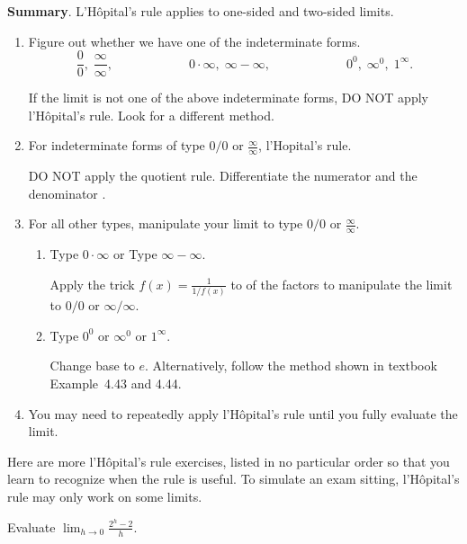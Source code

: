 \documentclass[../main.tex]{subfiles}
\begin{document}
\textbf{Summary}. L'H\^opital's rule applies to one-sided and two-sided limits. 

\begin{enumerate}[wide, label=(Step~\arabic*)., itemsep={2ex}]
  \item Figure out whether we have one of the indeterminate forms.
    \[
      \frac{0}{0},\; \frac{\infty}{\infty}, \hspace{1in} 0 \cdot \infty,\; \infty - \infty, \hspace{1in} 0^{0}, \; \infty^{0}, \; 1^{\infty}.
    \]

    If the limit is not one of the above indeterminate forms, DO NOT apply l'H\^opital's rule. Look for a different method.

  \item[{\faStar{}}] For indeterminate forms of type \(0/0\) or \(\frac{\infty}{\infty}\),  l'Hopital's rule.


    DO NOT apply the quotient rule. Differentiate the numerator and the denominator .

  \item For all other types, manipulate your limit to type \(0/0\) or \(\frac{\infty}{\infty}\).
    \begin{enumerate}
      \item Type \(0 \cdot \infty\) or Type \(\infty - \infty\). 

        Apply the trick \(f(x) = \frac{1}{1/f(x)}\) to  of the factors to manipulate the limit to \(0/0\) or \(\infty/\infty\). 

      \item Type \(0^{0}\) or \(\infty^{0}\) or \(1^{\infty}\). 

        Change base to \(e\). Alternatively, follow the method shown in textbook Example~4.43 and 4.44.
    \end{enumerate}

  \item You may need to repeatedly apply l'H\^opital's rule until you fully evaluate the limit.
\end{enumerate}
\clearpage

Here are more l'H\^opital's rule exercises, listed in no particular order so that you learn to recognize when the rule is useful.  To simulate an exam sitting, l'H\^opital's rule may only work on some limits.

\begin{exercise}
  Evaluate \(\lim_{h \to 0} \frac{2^{h} - 2}{h}\). 

  \blanks*
\end{exercise}
\end{document}
